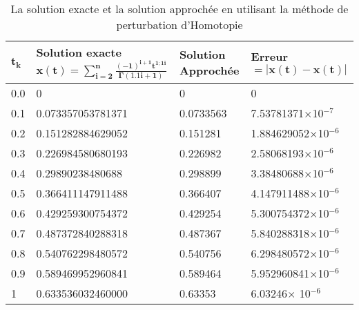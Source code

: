 \begin{table}[H] \label{tab:2}
\caption { La solution exacte et la solution approchée en utilisant la méthode de perturbation d'Homotopie} 
\begin{tabular*}{\linewidth}{llll}
$\mathbf{t_k}$ & \makecell{\textbf{Solution exacte} \\ $\mathbf{x(t)=\sum_{i=2}^{n} \frac{(-1)^{i+1}t^{1;1i}}{\Gamma(1.1i+1)}}$ } & \textbf{Solution Approchée} & \textbf{Erreur} $\mathbf{= |\mathbf{x(t)}-x(t)|}$    \\ 
\hline
0.0  &  0                  &  0                  &  0                \\
0.1  &  0.073357053781371  &  0.0733563  &  7.53781371$\times$10$^{-7}$\\
0.2  &  0.151282884629052  &  0.151281   &  1.884629052$\times$10$^{-6}$ \\
0.3  &  0.226984580680193  &  0.226982   &  2.58068193$\times$10$^{-6}$ \\
0.4  &  0.29890238480688   &  0.298899   &  3.38480688$\times$10$^{-6}$ \\
0.5  &  0.366411147911488  &  0.366407   &  4.147911488$\times$10$^{-6}$ \\
0.6  &  0.429259300754372  &  0.429254   &  5.300754372$\times$10$^{-6}$\\
0.7  &  0.487372840288318  &  0.487367   &  5.840288318$\times$10$^{-6}$\\
0.8  &  0.540762298480572  &  0.540756   &  6.298480572$\times$10$^{-6}$\\
0.9  &  0.589469952960841  &  0.589464   &  5.952960841$\times$10$^{-6}$\\
1    &  0.633536032460000  &  0.63353    &  6.03246$\times$ 10$^{-6}$\\
\hline
\end{tabular*}
\end{table}